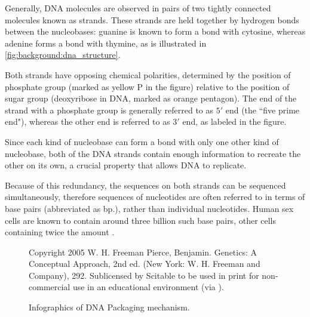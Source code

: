 \documentclass[parskip]{cs4rep}
\begin{document}
Generally, DNA molecules are observed in pairs of two tightly connected molecules known as strands. These strands are held together by hydrogen bonds between the nucleobases: guanine is
known to form a bond with cytosine, whereas adenine forms a bond with thymine, as is illustrated in \autoref{fig:background:dna_structure}.

Both strands have opposing chemical polarities, determined by the position
of phosphate group (marked as yellow P in the figure) relative to the position of sugar group (deoxyribose in DNA, marked as orange pentagon). The end of the strand with a phosphate group is generally referred to as $5'$ end (the ``five prime end"), whereas the other end is referred to as $3'$ end, as labeled in the figure.

Since each kind of nucleobase can form a bond with only one other kind of
nucleobase, both of the DNA strands contain enough information to recreate the
other on its own, a crucial property that allows DNA to replicate. 

Because of this redundancy, the sequences on both strands can be sequenced simultaneously, therefore sequences of nucleotides are often referred to in terms of base pairs (abbreviated as bp.), rather than individual nucleotides. Human sex cells are known to contain around three billion such base pairs, other cells containing twice the amount \cite{Annunziato:2008wh}.

\begin{figure}[p]
   \centering
   {Copyright 2005 W. H. Freeman Pierce, Benjamin. Genetics: A Conceptual Approach, 2nd ed. (New York: W. H. Freeman and Company), 292. Sublicensed by Scitable to be used in print for non-commercial use in an educational environment (via \cite{Annunziato:2008wh}).}
   
   \caption{Infographics of DNA Packaging mechanism. }
   \label{fig:background:dna_packaging} 
\end{figure}
\end{document}
